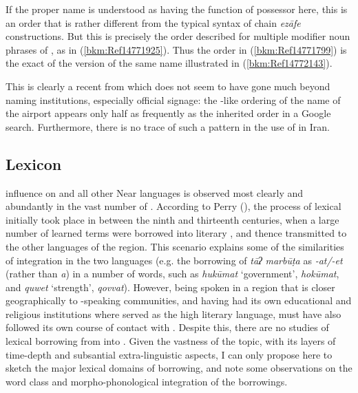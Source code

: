 \documentclass[output=paper]{langsci/langscibook}
\begin{document}
If the proper name is understood as having the function of possessor here, this is an order that is rather different from the typical   syntax of chain \textit{ezāfe} constructions. But this is precisely the order described for multiple modifier noun phrases of , as in (\ref{bkm:Ref14771925}). Thus the order in (\ref{bkm:Ref14771799}) is the exact  of the  version of the same name illustrated in (\ref{bkm:Ref14772143}).


This is clearly a recent  from  which does not seem to have gone much beyond naming institutions, especially official signage: the -like ordering of the name of the airport appears only half as frequently as the inherited order in a Google search. Furthermore, there is no trace of such a  pattern in the use of   in Iran.  

\subsection{Lexicon}

 influence on  and all other Near  languages is observed most clearly and abundantly in the vast number of . According to Perry (\citeyear[97]{Perry2005}), the process of lexical  initially took place in  between the ninth and thirteenth centuries, when a large number of learned terms were borrowed into literary , and thence transmitted to the other languages of the region. This scenario explains some of the similarities of  integration in the two languages (e.g. the borrowing of \textit{tāʔ} \textit{marbūṭa} as \textit{{}-at/-et} (rather than \textit{a}) in a number of words, such as \textit{hukūmat} ‘government’,  \textit{hokūmat}, and \textit{quwet} ‘strength’,  \textit{qovvat}). However, being spoken in a region that is closer geographically to -speaking communities, and having had its own educational and religious institutions where  served as the high literary language,  must have also followed its own course of contact with . Despite this, there are no studies of lexical borrowing from  into . Given the vastness of the topic, with its layers of time-depth and subsantial extra-linguistic aspects, I can only propose here to sketch the major lexical domains of borrowing, and note some observations on the word class and morpho-phonological integration of the borrowings. 
\end{document}
